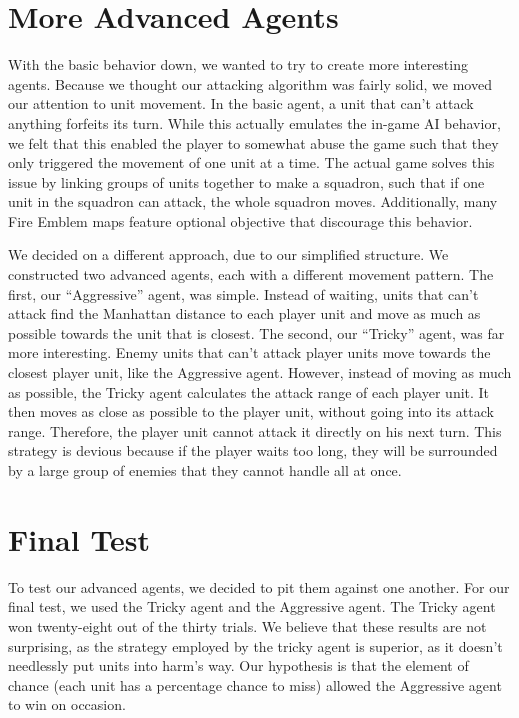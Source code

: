 \documentclass[12pt]{article} %
\begin{document}
\section{More Advanced Agents}
	With the basic behavior down, we wanted to try to create more interesting agents. Because we thought our attacking algorithm was fairly solid, we moved our attention to unit movement. In the basic agent, a unit that can’t attack anything forfeits its turn. While this actually emulates the in-game AI behavior, we felt that this enabled the player to somewhat abuse the game such that they only triggered the movement of one unit at a time. The actual game solves this issue by linking groups of units together to make a squadron, such that if one unit in the squadron can attack, the whole squadron moves. Additionally, many Fire Emblem maps feature optional objective that discourage this behavior.

	We decided on a different approach, due to our simplified structure. We constructed two advanced agents, each with a different movement pattern. The first, our “Aggressive” agent, was simple. Instead of waiting, units that can’t attack find the Manhattan distance to each player unit and move as much as possible towards the unit that is closest. The second, our “Tricky” agent, was far more interesting. Enemy units that can’t attack player units move towards the closest player unit, like the Aggressive agent. However, instead of moving as much as possible, the Tricky agent calculates the attack range of each player unit. It then moves as close as possible to the player unit, without going into its attack range. Therefore, the player unit cannot attack it directly on his next turn. This strategy is devious because if the player waits too long, they will be surrounded by a large group of enemies that they cannot handle all at once.

\section{Final Test}
	To test our advanced agents, we decided to pit them against one another. For our final test, we used the Tricky agent and the Aggressive agent. The Tricky agent won twenty-eight out of the thirty trials. We believe that these results are not surprising, as the strategy employed by the tricky agent is superior, as it doesn’t needlessly put units into harm’s way. Our hypothesis is that the element of chance (each unit has a percentage chance to miss) allowed the Aggressive agent to win on occasion.
\end{document}
